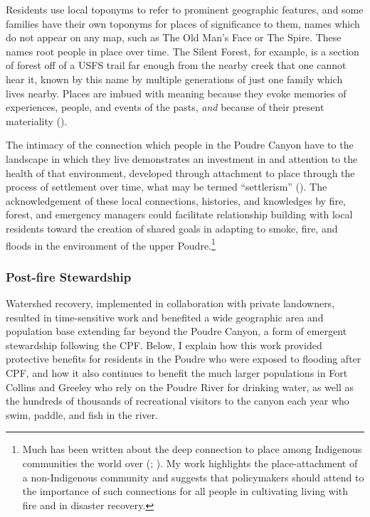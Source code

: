 \documentclass[
]{article}
\begin{document}
Residents use local toponyms to refer to prominent geographic features, and some families have their own toponyms for places of significance to them, names which do not appear on any map, such as The Old Man's Face or The Spire. These names root people in place over time. The Silent Forest, for example, is a section of forest off of a USFS trail far enough from the nearby creek that one cannot hear it, known by this name by multiple generations of just one family which lives nearby. Places are imbued with meaning because they evoke memories of experiences, people, and events of the pasts, \emph{and} because of their present materiality ().

The intimacy of the connection which people in the Poudre Canyon have to the landscape in which they live demonstrates an investment in and attention to the health of that environment, developed through attachment to place through the process of settlement over time, what may be termed ``settlerism'' (). The acknowledgement of these local connections, histories, and knowledges by fire, forest, and emergency managers could facilitate relationship building with local residents toward the creation of shared goals in adapting to smoke, fire, and floods in the environment of the upper Poudre.\footnote{Much has been written about the deep connection to place among Indigenous communities the world over (; ). My work highlights the place-attachment of a non-Indigenous community and suggests that policymakers should attend to the importance of such connections for all people in cultivating living with fire and in disaster recovery.}

\subsubsection{Post-fire Stewardship}\label{post-fire-stewardship}

Watershed recovery, implemented in collaboration with private landowners, resulted in time-sensitive work and benefited a wide geographic area and population base extending far beyond the Poudre Canyon, a form of emergent stewardship following the CPF. Below, I explain how this work provided protective benefits for residents in the Poudre who were exposed to flooding after CPF, and how it also continues to benefit the much larger populations in Fort Collins and Greeley who rely on the Poudre River for drinking water, as well as the hundreds of thousands of recreational visitors to the canyon each year who swim, paddle, and fish in the river.
\end{document}

